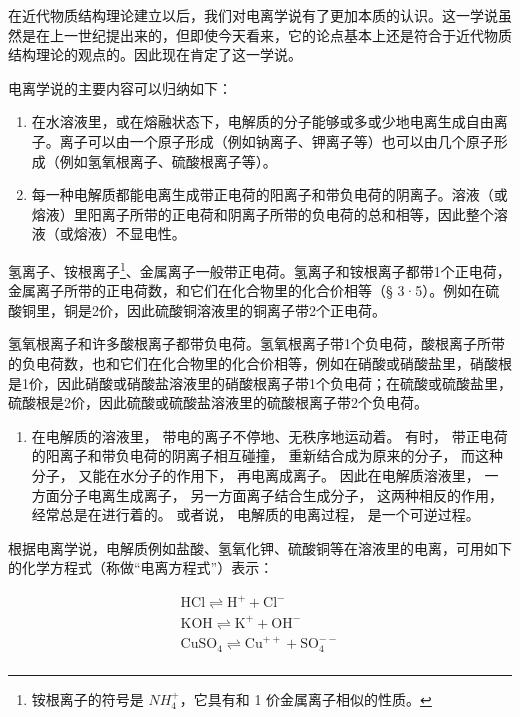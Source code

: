 在近代物质结构理论建立以后，我们对电离学说有了更加本质的认识。这一学说虽然是在上一世纪提出来的，但即使今天看来，它的论点基本上还是符合于近代物质结构理论的观点的。因此现在肯定了这一学说。

电离学说的主要内容可以归纳如下：

\begin{enumerate}
\item
  在水溶液里，或在熔融状态下，电解质的分子能够或多或少地电离生成自由离子。离子可以由一个原子形成（例如钠离子、钾离子等）也可以由几个原子形成（例如氢氧根离子、硫酸根离子等）。
\item
  每一种电解质都能电离生成带正电荷的阳离子和带负电荷的阴离子。溶液（或熔液）里阳离子所带的正电荷和阴离子所带的负电荷的总和相等，因此整个溶液（或熔液）不显电性。
\end{enumerate}

氢离子、铵根离子\footnote{铵根离子的符号是 \(NH_{4}^{+}\)，它具有和 1
  价金属离子相似的性质。}、金属离子一般带正电荷。氢离子和铵根离子都带1个正电荷，金属离子所带的正电荷数，和它们在化合物里的化合价相等（§
3·5）。例如在硫酸铜里，铜是2价，因此硫酸铜溶液里的铜离子带2个正电荷。

氢氧根离子和许多酸根离子都带负电荷。氢氧根离子带1个负电荷，酸根离子所带的负电荷数，也和它们在化合物里的化合价相等，例如在硝酸或硝酸盐里，硝酸根是1价，因此硝酸或硝酸盐溶液里的硝酸根离子带1个负电荷；在硫酸或硫酸盐里，硫酸根是2价，因此硫酸或硫酸盐溶液里的硫酸根离子带2个负电荷。

\begin{enumerate}[start=3]
\item
  在电解质的溶液里， 带电的离子不停地、无秩序地运动着。 有时，
  带正电荷的阳离子和带负电荷的阴离子相互碰撞， 重新结合成为原来的分子，
  而这种分子， 又能在水分子的作用下， 再电离成离子。
  因此在电解质溶液里， 一方面分子电离生成离子，
  另一方面离子结合生成分子， 这两种相反的作用， 经常总是在进行着的。
  或者说， 电解质的电离过程， 是一个可逆过程。
\end{enumerate}

根据电离学说，电解质例如盐酸、氢氧化钾、硫酸铜等在溶液里的电离，可用如下的化学方程式（称做``电离方程式''）表示：

\[
\begin{array}{l} \mathrm{HCl} \rightleftharpoons \mathrm{H} ^ {+} + \mathrm{Cl} ^ {-} \\ \mathrm{KOH} \rightleftharpoons \mathrm{K} ^ {+} + \mathrm{OH} ^ {-} \\ \mathrm{CuSO} _ {4} \rightleftharpoons \mathrm{Cu} ^ {+ +} + \mathrm{SO} _ {4} ^ {- -} \\ \end{array}
\]

